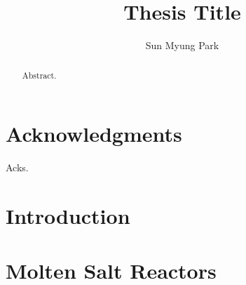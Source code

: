 \documentclass[edeposit,fullpage,11pt]{uiucthesis2018}
\title{Thesis Title}
\author{Sun Myung Park}
\begin{document}
\maketitle

\frontmatter
\begin{abstract}

Abstract.

\end{abstract}

\chapter*{Acknowledgments}

Acks.


\tableofcontents
\listoftables
\listoffigures

\printglossary[title=List of Abbreviations,type=\acronymtype,nonumberlist,
nogroupskip=true]

\pagebreak
\mainmatter
\glsresetall

\chapter{Introduction}
\label{chap:intro}


\chapter{Molten Salt Reactors}
\label{chap:msr}

\end{document}
